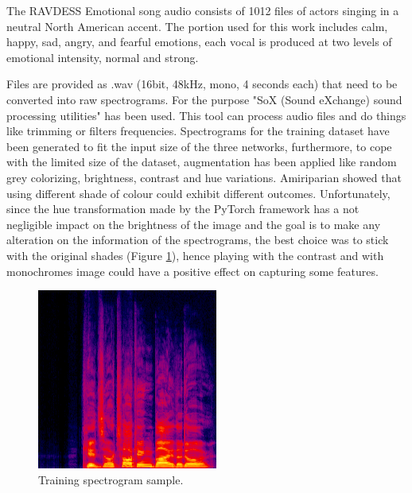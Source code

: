 \documentclass[10pt,twocolumn,letterpaper]{article}
\begin{document}
The RAVDESS Emotional song audio consists of 1012 files of actors singing in a neutral North American accent. The portion used for this work includes calm, happy, sad, angry, and fearful emotions, each vocal is produced at two levels of emotional intensity, normal and strong.

Files are provided as .wav (16bit, 48kHz, mono, 4 seconds each) that need to be converted into raw spectrograms. For the purpose "SoX (Sound eXchange) sound processing utilities" has been used. This tool can process audio files and do things like trimming or filters frequencies. Spectrograms for the training dataset have been generated to fit the input size of the three networks, furthermore, to cope with the limited size of the dataset, augmentation has been applied like random grey colorizing, brightness, contrast and hue variations. Amiriparian \etal \cite{Amiriparian} showed that using different shade of colour could exhibit different outcomes. Unfortunately, since the hue transformation made by the PyTorch framework has a not negligible impact on the brightness of the image and the goal is to make any alteration on the information of the spectrograms, the best choice was to stick with the original shades (Figure \ref{fig:training_sample}), hence playing with the contrast and with monochromes image could have a positive effect on capturing some features.

\begin{figure}[t]
   \begin{center}
   \includegraphics[width=0.8\linewidth]{img/happy_92.png}
   \end{center}
      \caption{Training spectrogram sample.}
   \label{fig:training_sample}
   \end{figure}
\end{document}
